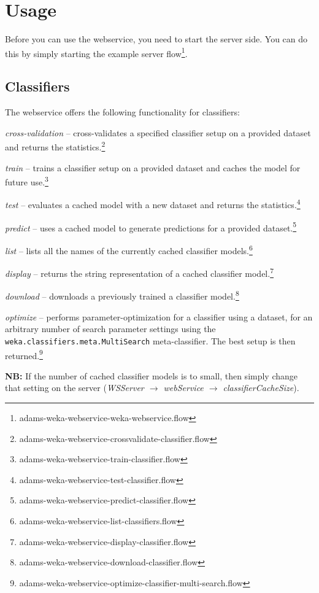 \documentclass[a4paper]{book}
\begin{document}
\clearpage
\chapter{Usage}
Before you can use the webservice, you need to start the server side. You can
do this by simply starting the example server 
flow\footnote{adams-weka-webservice-weka-webservice.flow}.

\section{Classifiers}
The webservice offers the following functionality for classifiers:
\begin{tight_itemize}
	\item \textit{cross-validation} -- cross-validates a specified classifier
	setup on a provided dataset and returns the statistics.\footnote{adams-weka-webservice-crossvalidate-classifier.flow}
	\item \textit{train} -- trains a classifier setup on a provided dataset 
	and caches the model for future use.\footnote{adams-weka-webservice-train-classifier.flow}
	\item \textit{test} -- evaluates a cached model with a new dataset and 
	returns the statistics.\footnote{adams-weka-webservice-test-classifier.flow}
	\item \textit{predict} -- uses a cached model to generate predictions for
	a provided dataset.\footnote{adams-weka-webservice-predict-classifier.flow}
	\item \textit{list} -- lists all the names of the currently cached classifier
	models.\footnote{adams-weka-webservice-list-classifiers.flow}
	\item \textit{display} -- returns the string representation of a cached
	classifier model.\footnote{adams-weka-webservice-display-classifier.flow}
	\item \textit{download} -- downloads a previously trained a classifier 
	model.\footnote{adams-weka-webservice-download-classifier.flow}
	\item \textit{optimize} -- performs parameter-optimization for a classifier
	using a dataset, for an arbitrary number of search parameter settings using 
	the \texttt{weka.classifiers.meta.MultiSearch} meta-classifier. The best setup is 
	then returned.\footnote{adams-weka-webservice-optimize-classifier-multi-search.flow}
\end{tight_itemize}
\textbf{NB:} If the number of cached classifier models is to small, then simply 
change that setting on the server
(\textit{WSServer $\rightarrow$ webService $\rightarrow$ classifierCacheSize}).
\end{document}
